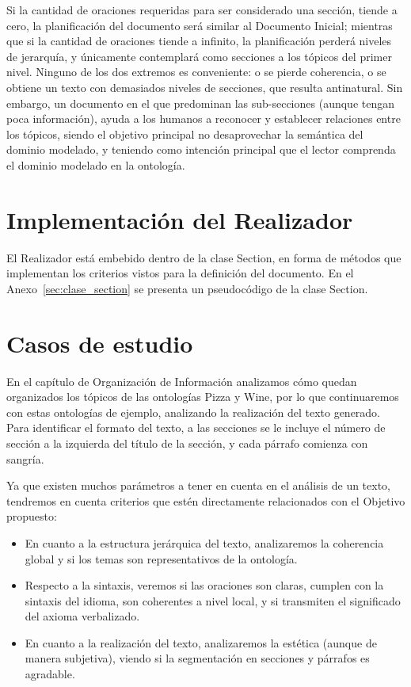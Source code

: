 Si la cantidad de oraciones requeridas para ser considerado una sección, tiende a cero, la planificación del documento será similar al Documento Inicial; mientras que si la cantidad de oraciones tiende a infinito, la planificación perderá niveles de jerarquía, y únicamente contemplará como secciones a los tópicos del primer nivel. Ninguno de los dos extremos es conveniente: o se pierde coherencia, o se obtiene un texto con demasiados niveles de secciones, que resulta antinatural. Sin embargo, un documento en el que predominan las sub-secciones (aunque tengan poca información), ayuda a los humanos a reconocer y establecer relaciones entre los tópicos, siendo el objetivo principal no desaprovechar la semántica del dominio modelado, y teniendo como intención principal que el lector comprenda el dominio modelado en la ontología.

\section{Implementación del Realizador}
El Realizador está embebido dentro de la clase Section, en forma de métodos que implementan los criterios vistos para la definición del documento. En el Anexo~\ref{sec:clase_section} se presenta un pseudocódigo de la clase Section.

\section{Casos de estudio}
En el capítulo de Organización de Información analizamos cómo quedan organizados los tópicos de las ontologías Pizza y Wine, por lo que continuaremos con estas ontologías de ejemplo, analizando la realización del texto generado. Para identificar el formato del texto, a las secciones se le incluye el número de sección a la izquierda del título de la sección, y cada párrafo comienza con sangría.

Ya que existen muchos parámetros a tener en cuenta en el análisis de un texto, tendremos en cuenta criterios que estén directamente relacionados con el Objetivo propuesto: \begin{itemize}
    \item En cuanto a la estructura jerárquica del texto, analizaremos la coherencia global y si los temas son representativos de la ontología.
    \item Respecto a la sintaxis, veremos si las oraciones son claras, cumplen con la sintaxis del idioma, son coherentes a nivel local, y si transmiten el significado del axioma verbalizado. 
    \item En cuanto a la realización del texto, analizaremos la estética (aunque de manera subjetiva), viendo si la segmentación en secciones y párrafos es agradable.
\end{itemize}


